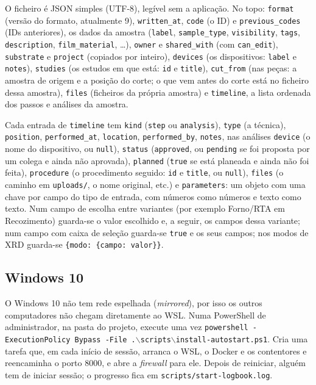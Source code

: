\documentclass[11pt,a4paper]{article}
\begin{document}
O ficheiro é JSON simples (UTF-8), legível sem a aplicação. No topo:
\texttt{format} (versão do formato, atualmente 9), \texttt{written\_at},
\texttt{code} (o ID) e \texttt{previous\_codes} (IDs anteriores), os dados da
amostra (\texttt{label}, \texttt{sample\_type}, \texttt{visibility},
\texttt{tags}, \texttt{description}, \texttt{film\_material}, \ldots),
\texttt{owner} e \texttt{shared\_with} (com \texttt{can\_edit}),
\texttt{substrate} e \texttt{project} (copiados por inteiro),
\texttt{devices} (os dispositivos: \texttt{label} e \texttt{notes}),
\texttt{studies} (os estudos em que está: \texttt{id} e \texttt{title}),
\texttt{cut\_from} (nas peças: a amostra de origem e a posição do corte; o que
vem antes do corte está no ficheiro dessa amostra), \texttt{files} (ficheiros
da própria amostra) e \texttt{timeline}, a lista ordenada dos passos e
análises da amostra.

Cada entrada de \texttt{timeline} tem \texttt{kind} (\texttt{step} ou
\texttt{analysis}), \texttt{type} (a técnica), \texttt{position},
\texttt{performed\_at}, \texttt{location}, \texttt{performed\_by},
\texttt{notes}, nas análises \texttt{device} (o nome do dispositivo, ou
\texttt{null}), \texttt{status} (\texttt{approved}, ou \texttt{pending} se foi
proposta por um colega e ainda não aprovada), \texttt{planned}
(\texttt{true} se está planeada e ainda não foi feita), \texttt{procedure}
(o procedimento seguido: \texttt{id} e \texttt{title}, ou \texttt{null}), \texttt{files} (o caminho em
\texttt{uploads/}, o nome original, etc.) e \texttt{parameters}: um objeto com
uma chave por campo do tipo de entrada, com números como números e texto como
texto. Num campo de escolha entre variantes (por exemplo Forno/RTA em
Recozimento) guarda-se o valor escolhido e, a seguir, os campos dessa
variante; num campo com caixa de seleção guarda-se \texttt{true} e os seus
campos; nos modos de XRD guarda-se \texttt{\{modo: \{campo: valor\}\}}.

\subsection{Windows 10}

O Windows 10 não tem rede espelhada (\emph{mirrored}), por isso os outros
computadores não chegam diretamente ao WSL. Numa PowerShell de
administrador, na pasta do projeto, execute uma vez
\texttt{powershell -ExecutionPolicy Bypass -File .$\backslash$scripts$\backslash$install-autostart.ps1}.
Cria uma tarefa que, em cada início de sessão, arranca o WSL, o Docker e os
contentores e reencaminha o porto 8000, e abre a \emph{firewall} para ele.
Depois de reiniciar, alguém tem de iniciar sessão; o progresso fica em
\texttt{scripts/start-logbook.log}.
\end{document}
